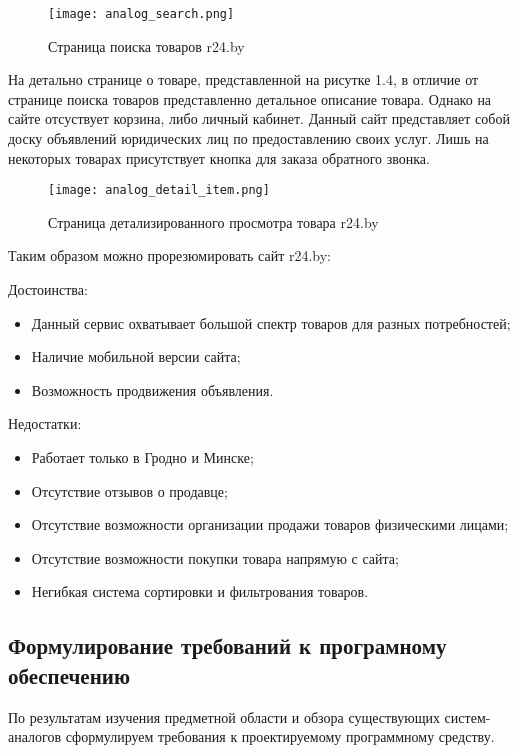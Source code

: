 \begin{figure}[ht]
  \centering
      \texttt{[image: analog\_search.png]}
      \caption{Страница поиска товаров r24.by}
\end{figure}

На детально странице о товаре, представленной на рисутке 1.4, в отличие от странице поиска товаров представленно  детальное описание товара.
Однако на сайте отсуствует корзина, либо личный кабинет.
Данный сайт представляет собой доску объявлений юридических лиц по предоставлению своих услуг.
Лишь на некоторых товарах присутствует кнопка для заказа обратного звонка.

\begin{figure}[ht]
  \centering
      \texttt{[image: analog\_detail\_item.png]}
      \caption{Страница детализированного просмотра товара r24.by}
\end{figure}

Таким образом можно прорезюмировать сайт r24.by:

Достоинства:
\begin{itemize}
  \item Данный сервис охватывает большой спектр товаров для разных потребностей;
  \item Наличие мобильной версии сайта;
  \item Возможность продвижения объявления.
\end{itemize}
\bigbreak
Недостатки:
\begin{itemize}
  \item Работает только в Гродно и Минске;
  \item Отсутствие отзывов о продавце;
  \item Отсутствие возможности организации продажи товаров физическими лицами;
  \item Отсутствие возможности покупки товара напрямую с сайта;
  \item Негибкая система сортировки и фильтрования товаров.
\end{itemize}


\subsection{Формулирование требований к програмному обеспечению}
По результатам изучения предметной области и обзора существующих систем-аналогов сформулируем требования к проектируемому программному средству.

